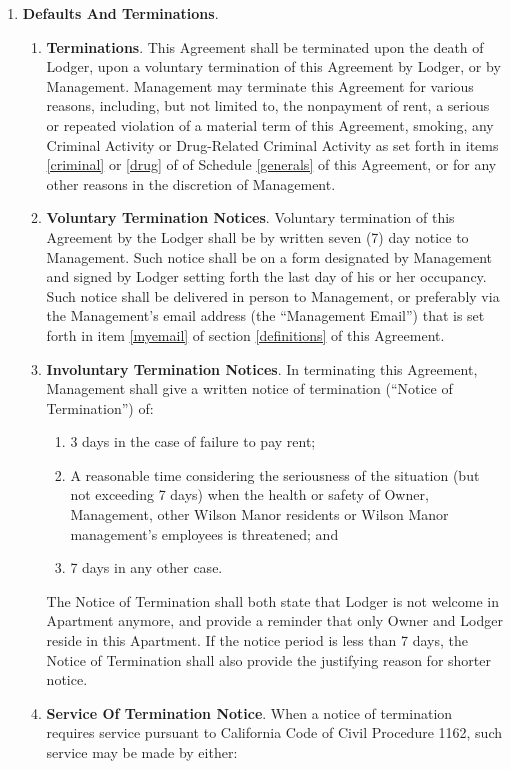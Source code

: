 \documentclass[12pt,letterpaper]{article}
\newcommand{\lodger}{Lodger}
\newcommand{\management}{Management}
\newcommand{\myemail}{Management Email}
\newcommand{\condo}{Wilson Manor}
\newcommand{\apt}{Apartment}
\begin{document}
\begin{enumerate}
		\item \textbf{Defaults And Terminations}. 
			\begin{enumerate}
				\item \textbf{Terminations}. 
					This Agreement shall be terminated upon the death of \lodger{}, upon a voluntary termination of this Agreement by \lodger{}, or by \management{}. \management{} may terminate this Agreement for various reasons, including, but not limited to, the nonpayment of rent, a serious or repeated violation of a material term of this Agreement, smoking, any Criminal Activity or Drug-Related Criminal Activity as set forth in items \ref{criminal} or \ref{drug} of of Schedule \ref{generals} of this Agreement, or for any other reasons in the discretion of \management{}.
				\item \textbf{Voluntary Termination Notices}. 
					Voluntary termination of this Agreement by the \lodger{} shall be by written seven (7) day notice to \management{}. Such notice shall be on a form designated by \management{} and signed by \lodger{} setting forth the last day of his or her occupancy. Such notice shall be delivered in person to \management{}, or preferably via the \management{}'s email address (the ``\myemail{}'') that is set forth in item \ref{myemail} of section \ref{definitions} of this Agreement{}. 
				\item \textbf{Involuntary Termination Notices}. \label{terminate}
					In terminating this Agreement, \management{} shall give a written notice of termination (``Notice of Termination'') of: 
					\begin{enumerate}
						\item 3 days in the case of failure to pay rent; 
						\item A reasonable time considering the seriousness of the situation (but not exceeding 7 days) when the health or safety of Owner, \management{}, other \condo{} residents or \condo{} management's employees is threatened; and 
						\item 7 days in any other case. 
					\end{enumerate} 
					The Notice of Termination shall both state that \lodger{} is not welcome in \apt{} anymore, and provide a reminder that only Owner and \lodger{} reside in this \apt{}. If the notice period is less than 7 days, the Notice of Termination shall also provide the justifying reason for shorter notice. 
				\item \textbf{Service Of Termination Notice}. \label{service}
					When a notice of termination requires service pursuant to California Code of Civil Procedure 1162, such service may be made by either: 

\end{enumerate}
\end{enumerate}
\end{document}

